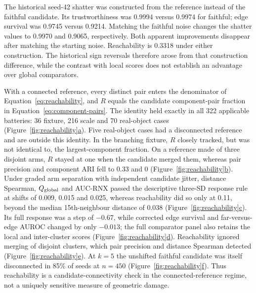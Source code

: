 \documentclass[11pt]{article}
\newcommand{\figpanel}[2]{Figure~\hyperref[#1]{\ref*{#1}#2}}
\begin{document}
The historical seed-42 shatter was constructed from the reference instead of the faithful candidate. Its trustworthiness was 0.9994 versus 0.9974 for faithful; edge survival was 0.9745 versus 0.9214. Matching the faithful noise changes the shatter values to 0.9970 and 0.9065, respectively. Both apparent improvements disappear after matching the starting noise. Reachability is 0.3318 under either construction. The historical sign reversals therefore arose from that construction difference, while the contrast with local scores does not establish an advantage over global comparators.

With a connected reference, every distinct pair enters the denominator of Equation~\ref{eq:reachability}, and $R$ equals the candidate component-pair fraction in Equation~\ref{eq:component-pairs}. The identity held exactly in all 322 applicable batteries: 36 fixture, 216 scale and 70 real-object cases (\figpanel{fig:reachability}{a}). Five real-object cases had a disconnected reference and are outside this identity. In the branching fixture, $R$ closely tracked, but was not identical to, the largest-component fraction. On a reference made of three disjoint arms, $R$ stayed at one when the candidate merged them, whereas pair precision and component ARI fell to 0.33 and 0 (\figpanel{fig:reachability}{b}). Under graded arm separation with independent candidate jitter, distance Spearman, $Q_{\rm global}$ and AUC-RNX passed the descriptive three-SD response rule at shifts of 0.009, 0.015 and 0.025, whereas reachability did so only at 0.11, beyond the median 15th-neighbour distance of 0.038 (\figpanel{fig:reachability}{c}). Its full response was a step of $-0.67$, while corrected edge survival and far-versus-edge AUROC changed by only $-0.013$; the full comparator panel also retains the local and inter-cluster scores (\figpanel{fig:reachability}{d}). Reachability ignored merging of disjoint clusters, which pair precision and distance Spearman detected (\figpanel{fig:reachability}{e}). At $k=5$ the unshifted faithful candidate was itself disconnected in 85\% of seeds at $n=450$ (\figpanel{fig:reachability}{f}). Thus reachability is a candidate-connectivity check in the connected-reference regime, not a uniquely sensitive measure of geometric damage.
\end{document}

